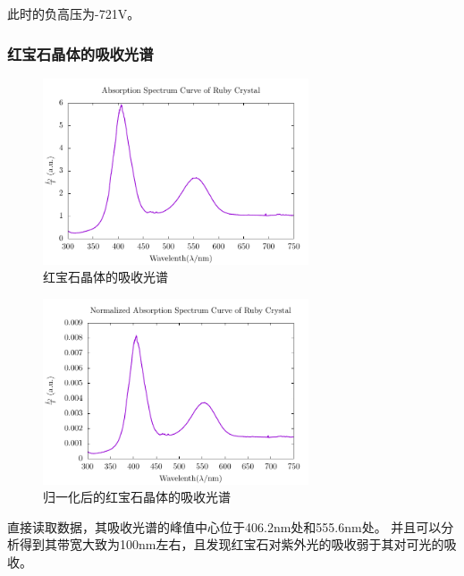 \documentclass[a4paper,UTF8]{ctexart}
\begin{document}
此时的负高压为-721V。

\subsubsection{红宝石晶体的吸收光谱}

\begin{figure}[H]
    \centering
    \begin{minipage}[b]{0.9\textwidth}
        \centering
        \includegraphics[width=0.7\textwidth]{./n_1.pdf}
        \caption{红宝石晶体的吸收光谱}
    \end{minipage}
\end{figure}

\begin{figure}[H]
    \centering
    \begin{minipage}[b]{0.9\textwidth}
        \centering
        \includegraphics[width=0.7\textwidth]{./n_2.pdf}
        \caption{归一化后的红宝石晶体的吸收光谱}
    \end{minipage}
\end{figure}

直接读取数据，其吸收光谱的峰值中心位于406.2nm处和555.6nm处。
并且可以分析得到其带宽大致为100nm左右，且发现红宝石对紫外光的吸收弱于其对可光的吸收。
\end{document}
